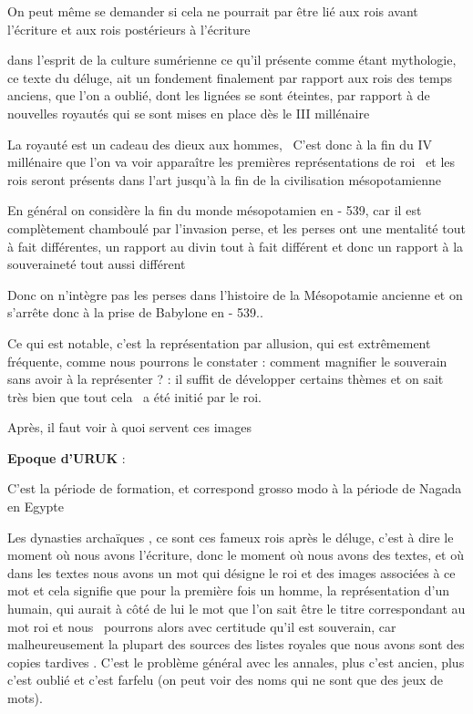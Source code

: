 \documentclass[a4paper]{article}
\begin{document}
{
On peut même se demander si cela ne pourrait par être lié aux rois avant
l'écriture et aux rois postérieurs à l'écriture}

{
dans l'esprit de la culture sumérienne ce qu'il présente comme étant
mythologie, ce texte du déluge, ait un fondement finalement par rapport
aux rois des temps anciens, que l'on a oublié, dont les lignées se sont
éteintes, par rapport à de nouvelles royautés qui se sont mises en
place dès le III millénaire}


\bigskip

{
La royauté est un cadeau des dieux aux hommes, \ C'est donc à la fin du
IV millénaire que l'on va voir apparaître les premières représentations
de roi \ et les rois seront présents dans l'art jusqu'à la fin de la
civilisation mésopotamienne}

{
En général on considère la fin du monde mésopotamien en - 539, car il
est complètement chamboulé par l'invasion perse, et les perses ont une
mentalité tout à fait différentes, un rapport au divin tout à fait
différent et donc un rapport à la souveraineté tout aussi différent}

{
Donc on n'intègre pas les perses dans l'histoire de la Mésopotamie
ancienne et on s'arrête donc à la prise de Babylone en - 539..}


\bigskip


\bigskip

{
Ce qui est notable, c'est la représentation par allusion, qui est
extrêmement fréquente, comme nous pourrons le constater : comment
magnifier le souverain sans avoir à la représenter ? : il suffit de
développer certains thèmes et on sait très bien que tout cela \ a été
initié par le roi. }

{
Après, il faut voir à quoi servent ces images}


\bigskip

{
\textbf{Epoque d'URUK} : }


\bigskip

{
C'est la période de formation, et correspond grosso modo à la période de
Nagada en Egypte}

{
Les dynasties archaïques , ce sont ces fameux rois après le déluge,
c'est à dire le moment où nous avons l'écriture, donc le moment où nous
avons des textes, et où dans les textes nous avons un mot qui désigne
le roi et des images associées à ce mot et cela signifie que pour la
première fois un homme, la représentation d'un humain, qui aurait à
côté de lui le mot que l'on sait être le titre correspondant au mot roi
et nous \ pourrons alors avec certitude qu'il est souverain, car
malheureusement la plupart des sources des listes royales que nous
avons sont des copies tardives . C'est le problème général avec les
annales, plus c'est ancien, plus c'est oublié et c'est farfelu (on peut
voir des noms qui ne sont que des jeux de mots).}
\end{document}

